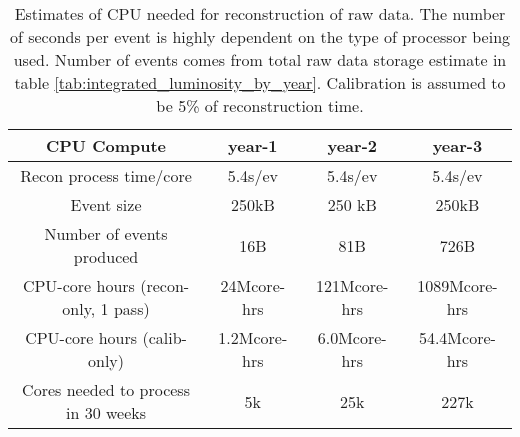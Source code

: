 \begin{table}[htb!]
    \centering
    \begin{tabular}{c|c|c|c}
        \hline
        CPU Compute & year-1 & year-2 & year-3 \\
        \hline
        \hline
        Recon process time/core	& 5.4s/ev	& 5.4s/ev	& 5.4s/ev \\
        \hline
        Event size	& 250kB	& 250 kB & 250kB \\
        \hline
        Number of events produced &	16B	& 81B & 726B \\
        \hline
        CPU-core hours (recon-only, 1 pass)	& 24Mcore-hrs	& 121Mcore-hrs &	1089Mcore-hrs \\
        \hline
        CPU-core hours (calib-only) &	1.2Mcore-hrs &	6.0Mcore-hrs &	54.4Mcore-hrs \\	
        \hline
        Cores needed to process in 30 weeks	& 5k &	25k &	227k \\
        \hline
    \end{tabular}
    \caption{Estimates of CPU needed for reconstruction of raw data. The number of seconds per event is highly dependent on the type of processor being used. Number of events comes from total raw data storage estimate in table \ref{tab:integrated_luminosity_by_year}. Calibration is assumed to be 5\% of reconstruction time.}
    \label{tab:cpu_summary}
\end{table}



